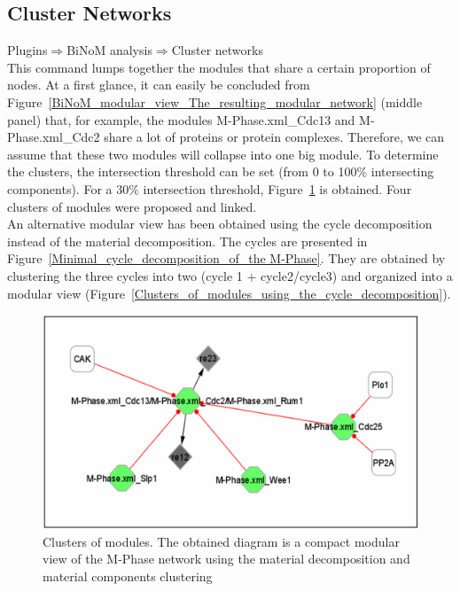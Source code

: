 \subsection{Cluster Networks}
Plugins$\Rightarrow$BiNoM analysis$\Rightarrow$Cluster networks\\
This command lumps together the modules that share a certain proportion of nodes. At a first glance, it can easily be concluded from Figure~\ref{BiNoM_modular_view_The_resulting_modular_network} (middle panel) that, for example, the modules M-Phase.xml\_Cdc13 and M-Phase.xml\_Cdc2 share a lot of proteins or protein complexes. Therefore, we can assume that these two modules will collapse into one big module. To determine the clusters, the intersection threshold can be set (from 0 to 100\% intersecting components). For a 30\% intersection threshold, Figure~\ref{Clusters_of_modules_using_the_material_decomposition} is obtained. Four clusters of modules were proposed and linked.\\
An alternative modular view has been obtained using the cycle decomposition instead of the material decomposition. The cycles are presented in Figure~\ref{Minimal_cycle_decomposition_of_the M-Phase}. They are obtained by clustering the three cycles into two (cycle 1 + cycle2/cycle3) and organized into a modular view (Figure~\ref{Clusters_of_modules_using_the_cycle_decomposition}).\\
\begin{figure}
\centering
\includegraphics[width=14 cm]{graphics/Clusters_of_modules_using_the_material_decomposition}
\caption{Clusters of modules. The obtained diagram is a compact modular view of the M-Phase network using the material decomposition and material components clustering}
\label{Clusters_of_modules_using_the_material_decomposition}
\end{figure}
